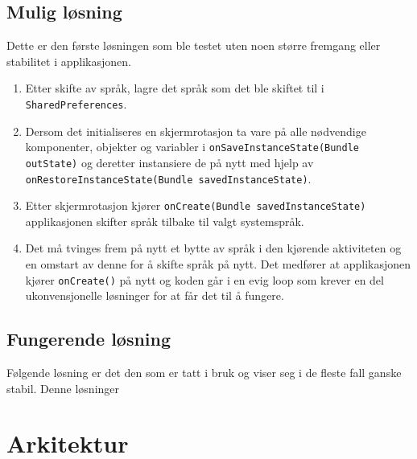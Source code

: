 \subsection{Mulig løsning}
Dette er den første løsningen som ble testet uten noen større fremgang eller stabilitet i applikasjonen. 
\begin{enumerate}
\item Etter skifte av språk, lagre det språk som det ble skiftet til i \texttt{SharedPreferences}.
\item Dersom det initialiseres en skjermrotasjon ta vare på alle nødvendige komponenter, objekter og variabler i \texttt{onSaveInstanceState(Bundle outState)} og deretter instansiere de på nytt med hjelp av \texttt{onRestoreInstanceState(Bundle savedInstanceState)}.
\item Etter skjermrotasjon kjører \texttt{onCreate(Bundle savedInstanceState)} applikasjonen skifter språk tilbake til valgt systemspråk. 
\item Det må tvinges frem på nytt et bytte av språk i den kjørende aktiviteten og en omstart av denne for å skifte språk på nytt. Det medfører at applikasjonen kjører \texttt{onCreate()} på nytt og koden går i en evig loop som krever en del ukonvensjonelle løsninger for at får det til å fungere. 
\end{enumerate}

\subsection{Fungerende løsning}
Følgende løsning er det den som er tatt i bruk og viser seg i de fleste fall ganske stabil. Denne løsninger 

\section{Arkitektur}


